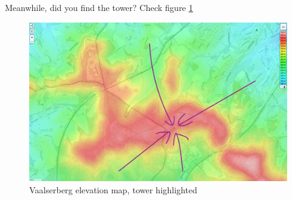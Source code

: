 Meanwhile, did you find the tower? Check figure \ref{fig:vaalserberg-a}

\begin{figure}
    \centering
    \includegraphics[width=\linewidth]{images/vaalserberg_found.png}
    \caption{Vaalserberg elevation map, tower highlighted}
    \label{fig:vaalserberg-a}
\end{figure}